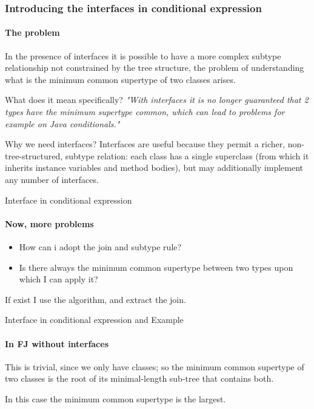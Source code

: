 \documentclass{beamer}
\begin{document}
\begin{frame}
	\frametitle{Introducing the interfaces in conditional expression}
	\framesubtitle{The problem}
	In the presence of interfaces it is possible to have a more complex subtype relationship not constrained by the tree structure, the problem of understanding what is the minimum common supertype of two classes arises.\newline
	\begin{block}{What does it mean specifically?}
		\textit{"With interfaces it is no longer guaranteed that 2 types have the minimum supertype common, which can lead to problems for example on Java conditionals."}
	\end{block}
\end{frame}

\begin{frame}{Why we need interfaces?}
    Interfaces are useful because they permit a richer, non-tree-structured, subtype relation: each class has a single superclass (from which it inherits instance variables and method bodies), but may additionally implement any number of interfaces.\newline\newline
    

\end{frame}

\begin{frame}{Interface in conditional expression}
\framesubtitle{Now, more problems}
\begin{itemize}
    \item  How can i adopt the join and subtype rule?
    \item  Is there always the minimum common supertype between two types upon which I can apply it?
    \end{itemize}
If exist I use the algorithm, and extract the join.
\end{frame}


\begin{frame}{Interface in conditional expression and Example}
\framesubtitle{In FJ without interfaces}
This is trivial, since we only have classes; so the minimum common supertype of two classes is the root of its minimal-length sub-tree that contains both.
    \begin{center}
\end{center}
In this case the minimum common supertype is the largest.
\end{frame}
\end{document}
